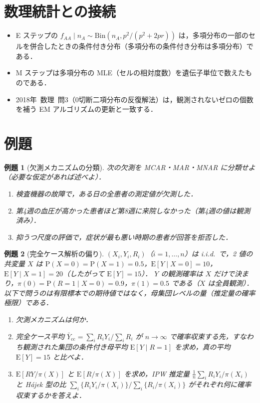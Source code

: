 \documentclass[a4paper,11pt,openany]{ltjsbook}
\newtheorem{reidai}{例題}[chapter]
\newcommand{\kakomonSM}[2]{\mbox{#1年 数理 問#2}}
\newcommand{\E}{\mathrm{E}}
\newcommand{\Prob}{\mathrm{P}}
\newcommand{\Bin}{\mathrm{Bin}}
\begin{document}
\section{数理統計との接続}\label{sec:16-link}
\begin{linkbox}
\begin{itemize}
\item E ステップの $f_{AA}\mid n_A\sim\Bin(n_A,p^2/(p^2+2pr))$ は，多項分布の一部のセルを併合したときの条件付き分布（多項分布の条件付き分布は多項分布）である．
\item M ステップは多項分布の MLE（セルの相対度数）を遺伝子単位で数えたものである．
\item \kakomonSM{2018}{3}（0切断二項分布の反復解法）は，観測されないゼロの個数を補う EM アルゴリズムの更新と一致する．
\end{itemize}
\end{linkbox}

\section{例題}\label{sec:16-ex}
\begin{reidai}[欠測メカニズムの分類]\label{reidai:16-1}
次の欠測を MCAR・MAR・MNAR に分類せよ（必要な仮定があれば述べよ）．
\begin{enumerate}[label=(\arabic*)]
\item 検査機器の故障で，ある日の全患者の測定値が欠測した．
\item 第4週の血圧が高かった患者ほど第8週に来院しなかった（第4週の値は観測済み）．
\item 抑うつ尺度の評価で，症状が最も悪い時期の患者が回答を拒否した．
\end{enumerate}
\end{reidai}

\begin{reidai}[完全ケース解析の偏り]\label{reidai:16-2}
$(X_i,Y_i,R_i)$（$i=1,\dots,n$）は i.i.d.\ で，2 値の共変量 $X$ は $\Prob(X=0)=\Prob(X=1)=0.5$，$\E[Y\mid X=0]=10$，$\E[Y\mid X=1]=20$（したがって $\E[Y]=15$）．
$Y$ の観測確率は $X$ だけで決まり，$\pi(0)=\Prob(R=1\mid X=0)=0.9$，$\pi(1)=0.5$ である（$X$ は全員観測）．
以下で問うのは有限標本での期待値ではなく，母集団レベルの量（推定量の確率極限）である．
\begin{enumerate}[label=(\arabic*)]
\item 欠測メカニズムは何か．
\item 完全ケース平均 $\bar Y_{\mathrm{cc}}=\sum_iR_iY_i/\sum_iR_i$ が $n\to\infty$ で確率収束する先，すなわち観測された集団の条件付き母平均 $\E[Y\mid R=1]$ を求め，真の平均 $\E[Y]=15$ と比べよ．
\item $\E[RY/\pi(X)]$ と $\E[R/\pi(X)]$ を求め，IPW 推定量 $\frac1n\sum_iR_iY_i/\pi(X_i)$ と Hájek 型の比 $\sum_i\{R_iY_i/\pi(X_i)\}/\sum_i\{R_i/\pi(X_i)\}$ がそれぞれ何に確率収束するかを答えよ．
\end{enumerate}
\end{reidai}
\end{document}
